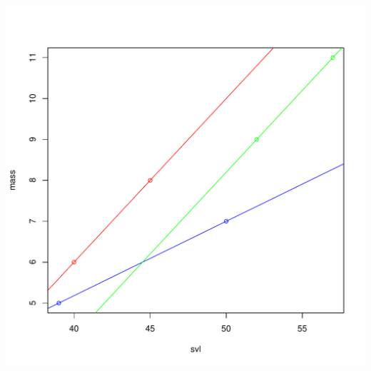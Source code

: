 \documentclass{article}\usepackage[]{graphicx}\usepackage[]{color}
\makeatletter
\def\maxwidth{ %
  \ifdim\Gin@nat@width>\linewidth
    \linewidth
  \else
    \Gin@nat@width
  \fi
}
\newenvironment{knitrout}{}{} %
\makeatother
\begin{document}
\begin{knitrout}
\includegraphics[width=\maxwidth]{figure/unnamed-chunk-114} 

\end{knitrout}
\end{document}
